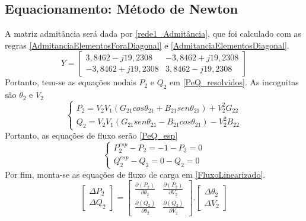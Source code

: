 \subsection{Equacionamento: Método de Newton}
A matriz admitância será dada por \ref{rede1_Admitância}, que foi calculado com as regras \ref{AdmitanciaElementosForaDiagonal} e \ref{AdmitanciaElementosDiagonal}.
\begin{equation}
   Y = \left[ 
    \begin{matrix} 
        3,8462-j19,2308 & -3,8462+j19,2308  \\ 
        -3,8462+j19,2308 & 3,8462-j19,2308  
    \end{matrix} \right] 
    \label{rede1_Admitância}
\end{equation}
Portanto, tem-se as equações nodais $P_2$ e $Q_2$ em \ref{PeQ_resolvidos}. As incognitas são $\theta_2$ e $V_2$
\begin{equation}
    \left\{    \begin{array}{lll}
                P_2= V_2V_1(G_{21}cos \theta_{21}+ B_{21}sen \theta_{21}) + V^2_2G_{22}\\
                Q_2= V_2V_1(G_{21}sen \theta_{21}- B_{21}cos \theta_{21}) - V^2_2B_{22}
            \end{array}\right.
    \label{PeQ_resolvidos}
\end{equation}
Portanto, as equações de fluxo serão \ref{PeQ_esp}
\begin{equation}
    \left\{    \begin{array}{lll}
                P^{esp}_2-P_2 = -1-P_2=0\\
                Q^{esp}_2-Q_2 = 0-Q_2=0
            \end{array}\right.
    \label{PeQ_esp}
\end{equation}
Por fim, monta-se as equações de fluxo de carga em \ref{FluxoLinearizado}.
\begin{equation}
   \left[ \begin{matrix} \Delta P_2 \\ \Delta Q_2  \end{matrix} \right] =  \left[ \begin{matrix} \frac{\partial (P_2)}{\partial \theta_2} & \frac{\partial (P_2)}{\partial V_2}  \\ \frac{\partial (Q_2)}{\partial \theta_2} & \frac{\partial (Q_2)}{\partial V_2} \end{matrix} \right] .  \left[ \begin{matrix} \Delta \theta_2 \\ \Delta V_2  \end{matrix} \right]
    \label{FluxoLinearizado}
\end{equation}
